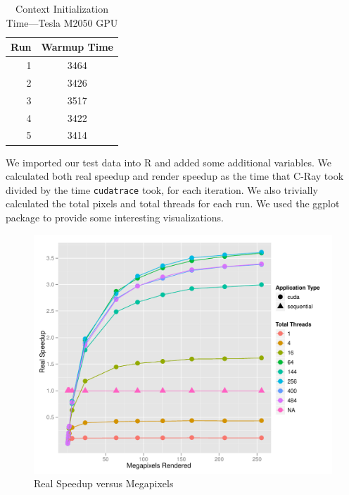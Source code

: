 \documentclass[12pt]{article}
\begin{document}
\begin{table}
    \caption{Context Initialization Time---Tesla M2050 GPU} \label{tab:warmup_time}
    \begin{center}
        \begin{tabular}{r | c}
            \toprule
            Run & Warmup Time \\
            \midrule
            1 & 3464 \\
            2 & 3426 \\
            3 & 3517 \\
            4 & 3422 \\
            5 & 3414 \\
            \bottomrule
        \end{tabular}
    \end{center}
\end{table}

We imported our test data into R and added some additional variables. We calculated both real speedup and render speedup as the time that C-Ray took divided by the time \texttt{cudatrace} took, for each iteration. We also trivially calculated the total pixels and total threads for each run. We used the ggplot package to provide some interesting visualizations.


\begin{figure}
    \caption{Real Speedup versus Megapixels} \label{fig:real_speedup}
    \begin{center}
\includegraphics{cudatrace-004}
    \end{center}
\end{figure}
\end{document}
